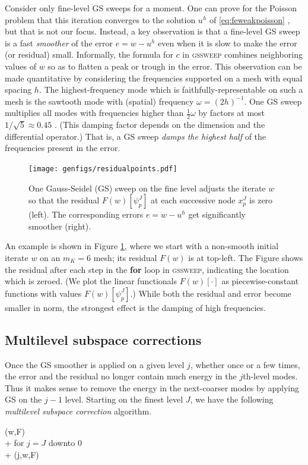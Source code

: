 \documentclass[letterpaper,final,12pt,reqno]{amsart}
\theoremstyle{claim}
\numberwithin{equation}{section}
\numberwithin{figure}{section}
\numberwithin{table}{section}
\begin{document}
Consider only fine-level GS sweeps for a moment.  One can prove for the Poisson problem that this iteration converges to the solution $u^h$ of \eqref{eq:feweakpoisson} \cite[for example]{Greenbaum1997}, but that is not our focus.  Instead, a key observation is that a fine-level GS sweep is a fast \emph{smoother} of the error $e=w-u^h$ even when it is slow to make the error (or residual) small.  Informally, the formula for $c$ in \textsc{gssweep} combines neighboring values of $w$ so as to flatten a peak or trough in the error.  This observation can be made quantitative by considering the frequencies supported on a mesh with equal spacing $h$.  The highest-frequency mode which is faithfully-representable on such a mesh is the sawtooth mode with (spatial) frequency $\omega=(2h)^{-1}$.  One GS sweep multiplies all modes with frequencies higher than $\frac{1}{2} \omega$ by factors at most $1/\sqrt{5}\approx 0.45$ \cite[Chapter 4]{Briggsetal2000}.  (This damping factor depends on the dimension and the differential operator.)  That is, a GS sweep \emph{damps the highest half} of the frequencies present in the error.

\begin{figure}[t]
\texttt{[image: genfigs/residualpoints.pdf]}
\caption{One Gauss-Seidel (GS) sweep on the fine level adjusts the iterate $w$ so that the residual $F(w)[\psi_p^J]$ at each successive node $x_p^J$ is zero (left).  The corresponding errors $e=w-u^h$ get significantly smoother (right).}
\label{fig:residualpoints}
\end{figure}

An example is shown in Figure \ref{fig:residualpoints}, where we start with a non-smooth initial iterate $w$ on an $m_K=6$ mesh; its residual $F(w)$ is at top-left.  The Figure shows the residual after each step in the \textbf{for} loop in \textsc{gssweep}, indicating the location which is zeroed.  (We plot the linear functionals $F(w)[\cdot]$ as piecewise-constant functions with values $F(w)[\psi_p^J]$.)  While both the residual and error become smaller in norm, the strongest effect is the damping of high frequencies.

\subsection*{Multilevel subspace corrections}  Once the GS smoother is applied on a given level $j$, whether once or a few times, the error and the residual no longer contain much energy in the $j$th-level modes.  Thus it makes sense to remove the energy in the next-coarser modes by applying GS on the $j-1$ level.  Starting on the finest level $J$, we have the following \emph{multilevel subspace correction} algorithm.
\begin{pseudo*}
(w,F)\text{:} \\+
    for $j=J$ downto $0$ \\+
        (j,w,F)
\end{pseudo*}
\end{document}
